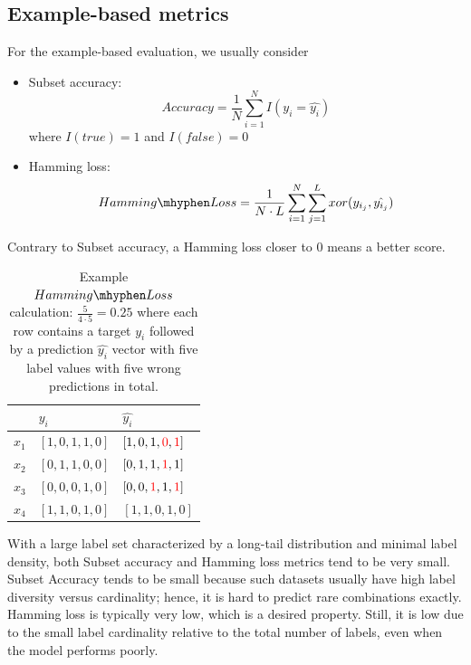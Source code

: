 \subsection{Example-based metrics}
For the example-based evaluation, we usually consider
\begin{itemize}
  \item Subset accuracy:
    \begin{equation}
      Accuracy = \frac{1}{N}\sum_{i=1}^{N}I( y_i = \hat{y_i})
    \end{equation}
    where  $I(true) = 1$ and $I(false) = 0$
  \item Hamming loss:
    \begin{equation}
      Hamming\mhyphen Loss = \frac{1}{N \cdot L}\sum_{i=1}^{N}\sum_{j=1}^{L}{xor(y_{i_j},\hat{y_{i_j}})}
    \end{equation}
\end{itemize}
Contrary to Subset accuracy, a Hamming loss closer to 0 means a better score.
\begin{table}[htb]
    \caption{Example $Hamming\mhyphen Loss$ calculation: $\frac{5}{4 \cdot 5} = 0.25$ where each row contains a target $y_i$ followed by a prediction $\hat{y_i}$ vector with five label values with five wrong predictions in total.}
	\label{tab:hamming}
	\centering
    \begin{tabular}{lll}
        \hline
        &$y_i$&$\hat{y_i}$\\
        \hline
        $x_1$&$[1, 0, 1, 1, 0]$&$[1, 0, 1, \textcolor{red}{0}, \textcolor{red}{1}]$\\
        $x_2$&$[0, 1, 1, 0, 0]$&$[0, 1, 1, \textcolor{red}{1}, 1]$\\
        $x_3$&$[0, 0, 0, 1, 0]$&$[0, 0, \textcolor{red}{1}, 1, \textcolor{red}{1}]$\\
        $x_4$&$[1, 1, 0, 1, 0]$&$[1, 1, 0, 1, 0]$\\
        \hline
    \end{tabular}
\end{table}

With a large label set characterized by a long-tail distribution and minimal label density, both Subset accuracy and Hamming loss metrics tend to be very small.
Subset Accuracy tends to be small because such datasets usually have high label diversity versus cardinality; hence, it is hard to predict rare combinations exactly.
Hamming loss is typically very low, which is a desired property. Still, it is low due to the small label cardinality relative to the total number of labels, even when the model performs poorly.

